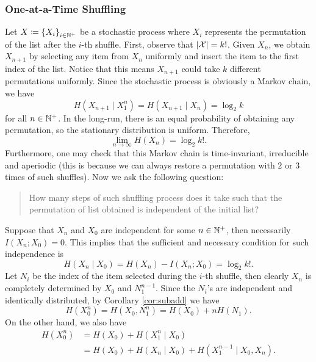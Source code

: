 \documentclass[math, code]{amznotes}
\theoremstyle{remark}
\begin{document}
\subsubsection{One-at-a-Time Shuffling}
Let $X \coloneqq \left\{X_i\right\}_{i \in \mathbb{N}^+}$ be a stochastic process where $X_i$ represents the permutation of the list after the $i$-th shuffle. First, observe that ${\left\lvert {\mathcal{X}} \right\rvert} = k!$. Given $X_n$, we obtain $X_{n + 1}$ by selecting any item from $X_n$ uniformly and insert the item to the first index of the list. Notice that this means $X_{n + 1}$ could take $k$ different permutations uniformly. Since the stochastic process is obviously a Markov chain, we have
\begin{equation*}
    H\left(X_{n + 1} \mid X_1^n\right) = H\left(X_{n + 1} \mid X_n\right) = \log_2 k
\end{equation*}
for all $n \in \mathbb{N}^+$. In the long-run, there is an equal probability of obtaining any permutation, so the stationary distribution is uniform. Therefore,
\begin{equation*}
    \lim_{n \to \infty}H\left(X_n\right) = \log_2 k!.
\end{equation*}
Furthermore, one may check that this Markov chain is time-invariant, irreducible and aperiodic (this is because we can always restore a permutation with $2$ or $3$ times of such shuffles). Now we ask the following question:
\begin{quote}
    How many steps of such shuffling process does it take such that the permutation of list obtained is independent of the initial list?
\end{quote}
Suppose that $X_n$ and $X_0$ are independent for some $n \in \mathbb{N}^+$, then necessarily $I\left(X_n ; X_0\right) = 0$. This implies that the sufficient and necessary condition for such independence is 
\begin{equation*}
    H\left(X_n \mid X_0\right) = H\left(X_n\right) - I\left(X_n ; X_0\right) = \log_2 k!.
\end{equation*}
Let $N_i$ be the index of the item selected during the $i$-th shuffle, then clearly $X_n$ is completely determined by $X_0$ and $N_1^{n - 1}$. Since the $N_i$'s are independent and identically distributed, by Corollary \ref{cor:subadd} we have
\begin{equation*}
    H\left(X_0^n\right) = H\left(X_0, N_1^{n}\right) = H\left(X_0\right) + nH\left(N_1\right).
\end{equation*}
On the other hand, we also have 
\begin{align*}
    H\left(X_0^n\right) & = H\left(X_0\right) + H\left(X_1^n \mid X_0\right) \\
    & = H\left(X_0\right) + H\left(X_n \mid X_0\right) + H\left(X_1^{n - 1} \mid X_0, X_n\right).
\end{align*}
\end{document}
